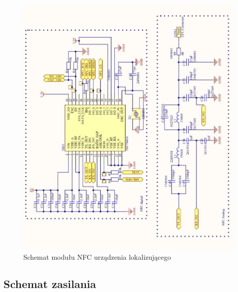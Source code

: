 \begin{figure}[H]
	\centering
	\includegraphics[width=14cm]{img/schematics/mainboard_NFC.jpg}
	\caption{Schemat modułu NFC urządzenia lokalizującego}
	\label{fig:image_mainboard_NFC_schematic}
\end{figure}



\subsection{Schemat zasilania}

